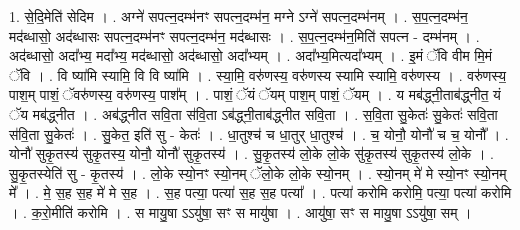 \documentclass[17pt]{extarticle}
\begin{document}
1. से॒दि॒मेति॑ सेदिम । . अग्ने॑ सपत्न॒दम्भ॑नꣳ सपत्न॒दम्भ॑न॒ मग्ने ऽग्ने॑ सपत्न॒दम्भ॑नम् । . स॒प॒त्न॒दम्भ॑न॒ मद॑ब्धासो॒ अद॑ब्धासः सपत्न॒दम्भ॑नꣳ सपत्न॒दम्भ॑न॒ मद॑ब्धासः । . स॒प॒त्न॒दम्भ॑न॒मिति॑ सपत्न - दम्भ॑नम् । . अद॑ब्धासो॒ अदा᳚भ्य॒ मदा᳚भ्य॒ मद॑ब्धासो॒ अद॑ब्धासो॒ अदा᳚भ्यम् । . अदा᳚भ्य॒मित्यदा᳚भ्यम् । . इ॒मं ॅवि वीम मि॒मं ॅवि । . वि ष्या॑मि स्यामि॒ वि वि ष्या॑मि । . स्या॒मि॒ वरु॑णस्य॒ वरु॑णस्य स्यामि स्यामि॒ वरु॑णस्य । . वरु॑णस्य॒ पाश॒म् पाशं॒ ॅवरु॑णस्य॒ वरु॑णस्य॒ पाश᳚म् । . पाशं॒ ॅयं ॅयम् पाश॒म् पाशं॒ ॅयम् । . य मब॑द्ध्नी॒ताब॑द्ध्नीत॒ यं ॅय मब॑द्ध्नीत । . अब॑द्ध्नीत सवि॒ता स॑वि॒ता ऽब॑द्ध्नी॒ताब॑द्ध्नीत सवि॒ता । . स॒वि॒ता सु॒केतः॑ सु॒केतः॑ सवि॒ता स॑वि॒ता सु॒केतः॑ । . सु॒केत॒ इति॑ सु - केतः॑ । . धा॒तुश्च॑ च धा॒तुर् धा॒तुश्च॑ । . च॒ योनौ॒ योनौ॑ च च॒ योनौ᳚ । . योनौ॑ सुकृ॒तस्य॑ सुकृ॒तस्य॒ योनौ॒ योनौ॑ सुकृ॒तस्य॑ । . सु॒कृ॒तस्य॑ लो॒के लो॒के सु॑कृ॒तस्य॑ सुकृ॒तस्य॑ लो॒के । . सु॒कृ॒तस्येति॑ सु - कृ॒तस्य॑ । . लो॒के स्यो॒नꣳ स्यो॒नम् ॅलो॒के लो॒के स्यो॒नम् । . स्यो॒नम् मे॑ मे स्यो॒नꣳ स्यो॒नम् मे᳚ । . मे॒ स॒ह स॒ह मे॑ मे स॒ह । . स॒ह पत्या॒ पत्या॑ स॒ह स॒ह पत्या᳚ । . पत्या॑ करोमि करोमि॒ पत्या॒ पत्या॑ करोमि । . क॒रो॒मीति॑ करोमि । . स मायु॒षा ऽऽयु॑षा॒ सꣳ स मायु॑षा । . आयु॑षा॒ सꣳ स मायु॒षा ऽऽयु॑षा॒ सम् । \newline
\end{document}
